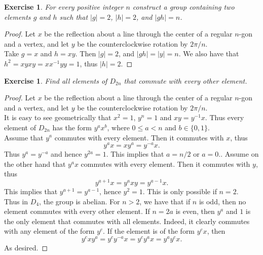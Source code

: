 \documentclass[a4paper, 11pt]{book}
\theoremstyle{plain}
\newtheorem{exercise}[theorem]{Exercise}
\theoremstyle{plain}
\begin{document}
\begin{exercise}
For every positive integer $n$ construct a group containing two elements $g$ and $h$ such that $|g|=2$, $|h|=2$, and $|gh|=n$.
\end{exercise}
\begin{proof}
Let $x$ be the reflection about a line through the center of a regular $n$-gon and a vertex, and let $y$ be the counterclockwise rotation by $2\pi/n$.\\
Take $g=x$ and $h=xy$. Then $|g|=2$, and $|gh| = |y| = n$. We also have that $h^2 = xyxy = xx^{-1}yy = 1$, thus $|h|=2$.
\end{proof}

\begin{exercise}
Find all elements of $D_{2n}$ that commute with every other element.
\end{exercise}
\begin{proof}
Let $x$ be the reflection about a line through the center of a regular $n$-gon and a vertex, and let $y$ be the counterclockwise rotation by $2\pi/n$.\\
It is easy to see geometrically that $x^2 = 1$, $y^n=1$ and $xy = y^{-1}x$. Thus every element of $D_{2n}$ has the form $y^ax^b$, where $0\leq a<n$ and $b\in \{0,1\}$.\\
Assume that $y^a$ commutes with every element. Then it commutes with $x$, thus
$$y^ax = xy^a = y^{-a}x.$$
Thus $y^a = y^{-a}$ and hence $y^{2a} = 1$. This implies that $a=n/2$ or $a=0$.. Assume on the other hand that $y^a x$ commutes with every element. Then it commutes with $y$, thus
$$y^{a+1}x = y^axy = y^{a-1}x.$$
This implies that $y^{a+1} = y^{a-1}$, hence $y^2 = 1$. This is only possible if $n=2$.\\
Thus in $D_4$, the group is abelian. For $n>2$, we have that if $n$ is odd, then no element commutes with every other element. If $n=2a$ is even, then $y^a$ and $1$  is the only element that commutes with all elements. Indeed, it clearly commutes with any element of the form $y^c$. If the element is of the form $y^c x$, then
$$y^cxy^a = y^c y^{-a}x = y^c y^a x = y^a y^cx.$$
As desired.
\end{proof}
\end{document}
